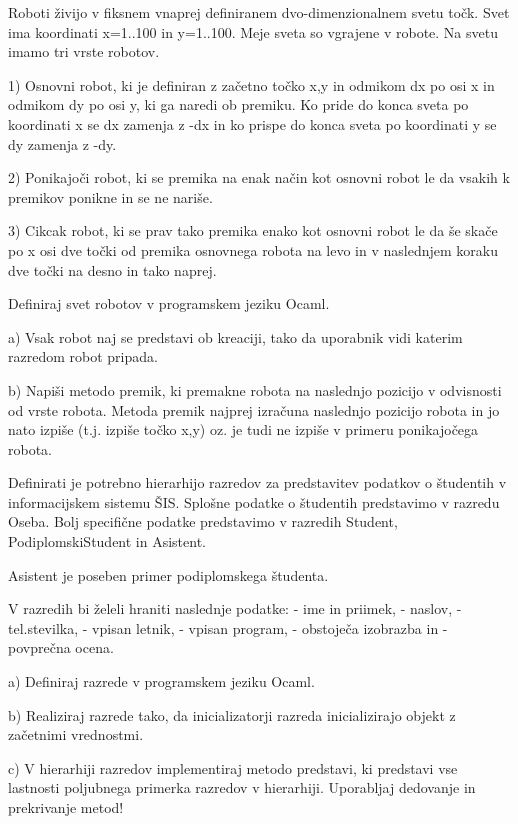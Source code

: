 \begin{ex}
Roboti \v zivijo v fiksnem vnaprej definiranem dvo-dimenzionalnem svetu to\v ck. Svet ima koordinati x=1..100 in y=1..100. Meje sveta so vgrajene v robote. Na svetu imamo tri vrste robotov.

1) Osnovni robot, ki je definiran z za\v cetno to\v cko x,y in odmikom dx po osi x in odmikom dy po osi y, ki ga naredi ob premiku. Ko pride do konca sveta po koordinati x se dx zamenja z -dx in ko prispe do konca sveta po koordinati y se dy zamenja z -dy.

2) Ponikajo\v ci robot, ki se premika na enak na\v cin kot osnovni robot le da vsakih k premikov ponikne in se ne nari\v se.

3) Cikcak robot, ki se prav tako premika enako kot osnovni robot le da \v se ska\v ce po x osi dve to\v cki od premika osnovnega robota na levo in v naslednjem koraku dve to\v cki na desno in tako naprej.

Definiraj svet robotov v programskem jeziku Ocaml. 

a) Vsak robot naj se predstavi ob kreaciji, tako da uporabnik vidi katerim razredom robot pripada.

b) Napi\v si metodo premik, ki premakne robota na naslednjo pozicijo v odvisnosti od vrste robota. Metoda premik najprej izra\v cuna naslednjo pozicijo robota in jo nato izpi\v se (t.j. izpi\v se to\v cko x,y) oz. je tudi ne izpi\v se v primeru ponikajo\v cega robota.



\end{ex}
\begin{ex}
Definirati je potrebno hierarhijo razredov za predstavitev podatkov o \v studentih v informacijskem sistemu \v SIS. Splo\v sne podatke o \v studentih predstavimo v razredu Oseba. Bolj specifi\v cne podatke predstavimo v razredih Student, PodiplomskiStudent in Asistent.

Asistent je poseben primer podiplomskega \v studenta. 

V razredih bi \v zeleli hraniti naslednje podatke: 
- ime in priimek, 
- naslov, 
- tel.stevilka, 
- vpisan letnik, 
- vpisan program, 
- obstoje\v ca izobrazba in 
- povpre\v cna ocena. 

a) Definiraj razrede v programskem jeziku Ocaml.

b) Realiziraj razrede tako, da inicializatorji razreda inicializirajo objekt z za\v cetnimi vrednostmi.

c) V hierarhiji razredov implementiraj metodo predstavi, ki predstavi vse lastnosti poljubnega primerka razredov v hierarhiji. Uporabljaj dedovanje in prekrivanje metod!



\end{ex}
